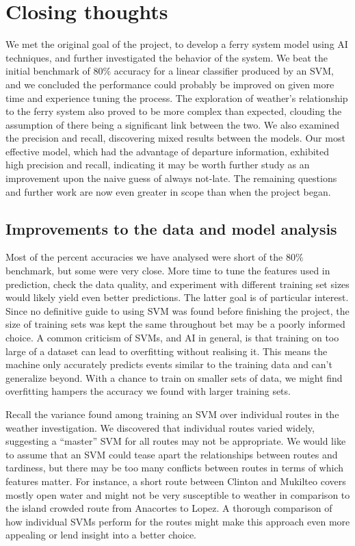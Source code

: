 \documentclass[11pt]{article} %
\begin{document}
\section{Closing thoughts}
\label{sec:summary}
We met the original goal of the project, to develop a ferry system model using AI 
techniques, and further investigated the behavior of the
system. We beat the initial benchmark of $80\%$ accuracy for a linear classifier 
produced by an SVM, and we concluded the performance could probably be improved
on given more time and experience tuning the process. The exploration of weather's
relationship to the ferry system also proved to be more complex than expected, 
clouding the assumption of there being a significant link between the two. We 
also examined the precision and recall, discovering mixed results between the 
models. Our most effective model, which had the advantage of departure information,
exhibited high precision and recall, indicating it may be worth further study
as an improvement upon the naive guess of always not-late. The remaining 
questions and further work are now even greater in scope than when the 
project began.

\subsection{Improvements to the data and model analysis}
\label{sec:improvements}
Most of the percent accuracies we have analysed were short of the $80\%$ benchmark,
but some were very close. More time to tune the features used in prediction, 
check the data quality, and experiment with different training set sizes would
likely yield even better predictions. The latter goal is of particular interest.
Since no definitive guide to using SVM was found before finishing the project, 
the size of training sets was kept the same throughout bet may be a poorly informed
choice. A common criticism of SVMs, and AI in general, is that training on too
large of a dataset can lead to overfitting without realising it. This means the
machine only accurately predicts events similar to the training data
and can't generalize beyond. With a chance to train on smaller sets of data,
we might find overfitting hampers the accuracy we found with larger training sets.

Recall the variance found among training an SVM over individual routes in the 
weather investigation. We discovered that individual routes varied widely, 
suggesting a 
``master'' SVM for all routes may not be appropriate. We would like to assume that
an SVM could tease apart the relationships between routes and tardiness, but there
may be too many conflicts between routes in terms of which features matter. For 
instance, a short route between Clinton and Mukilteo covers mostly open water
and might not be very susceptible to weather in comparison to the island crowded
route from Anacortes to Lopez. A thorough comparison of how individual SVMs 
perform for the routes might make this approach even more appealing or lend 
insight into a better choice.
\end{document}
